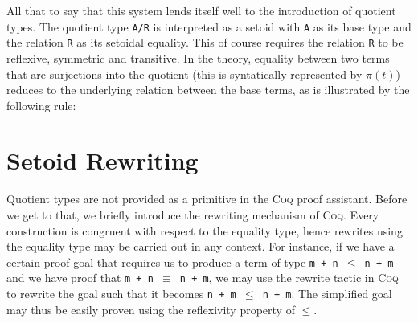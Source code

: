 \documentclass[12pt,twoside,maitrise]{dms}
\theoremstyle{definition}
\numberwithin{equation}{section}
\numberwithin{table}{chapter}
\numberwithin{figure}{chapter}
\newcommand\kw[1] {\textsf{#1}}
\newcommand\id[1] {\texttt{#1}}
\newcommand\fn[1] {\texttt{#1}}
\def\Coq{\textsc{Coq}\xspace}
\begin{document}
All that to say that this system lends itself well to the introduction of
quotient types. The quotient type \fn{A/R} is interpreted as a setoid with
\id{A} as its base type and the relation \id{R} as its setoidal equality. This
of course requires the relation \id{R} to be reflexive, symmetric and
transitive. In the theory, equality between two terms that are surjections into
the quotient (this is syntatically represented by $\pi(t)$) reduces to the
underlying relation between the base terms, as is illustrated by the following
rule:


\begin{prooftree*}

\end{prooftree*}


\section{Setoid Rewriting}

Quotient types are not provided as a primitive in the \Coq{} proof assistant.
Before we get to that, we briefly introduce the rewriting mechanism of \Coq{}.
Every construction is congruent with respect to the equality type, hence
rewrites using the equality type may be carried out in any context. For
instance, if we have a certain proof goal that requires us to produce a term of
type \fn{m + n $\le$ n + m} and we have proof that \fn{m + n $\equiv$ n + m}, we
may use the \kw{rewrite} tactic in \Coq{} to rewrite the goal such that it
becomes \fn{n + m $\le$ n + m}. The simplified goal may thus be easily proven
using the reflexivity property of $\le$.
\end{document}
